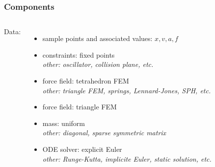 \documentclass[a4paper,compress]{beamer}
\begin{document}
\begin{frame}
\frametitle{Components}
\begin{columns}
Data:
\begin{itemize}
\item<1-> sample points and associated values: $x,v,a,f$
\item<1-> constraints: fixed points 
 {\\ \em other: oscillator, collision plane, etc.}
\item<2-> force field: tetrahedron FEM
 {\\ \em other: triangle FEM, springs, Lennard-Jones, SPH, etc.}
\item<3-> force field: triangle FEM
\item<4-> mass: uniform
 {\\ \em other: diagonal, sparse symmetric matrix}
\item<5-> ODE solver: explicit Euler
 {\\ \em other: Runge-Kutta, implicite Euler, static solution, etc.}
\end{itemize}

\end{columns}
\end{frame}
\end{document}
